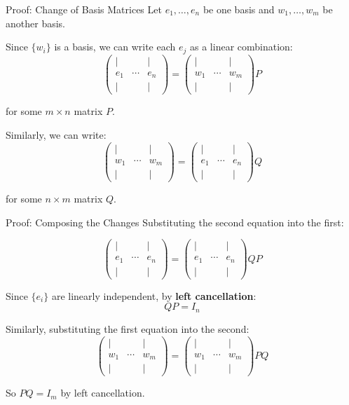 \documentclass[10pt]{beamer}
\theoremstyle{definition}
\newcommand{\x}[1]{\alert{\textbf{#1}}}
\begin{document}
\begin{frame}{Proof: Change of Basis Matrices}
Let $e_1, \ldots, e_n$ be one basis and $w_1, \ldots, w_m$ be another basis.

\vfill
Since $\{w_i\}$ is a basis, we can write each $e_j$ as a linear combination:
$$\begin{pmatrix} | & & | \\ e_1 & \cdots & e_n \\ | & & | \end{pmatrix} = \begin{pmatrix} | & & | \\ w_1 & \cdots & w_m \\ | & & | \end{pmatrix} P$$

for some $m \times n$ matrix $P$.

\vfill
Similarly, we can write:
$$\begin{pmatrix} | & & | \\ w_1 & \cdots & w_m \\ | & & | \end{pmatrix} = \begin{pmatrix} | & & | \\ e_1 & \cdots & e_n \\ | & & | \end{pmatrix} Q$$

for some $n \times m$ matrix $Q$.
\end{frame}

\begin{frame}{Proof: Composing the Changes}
Substituting the second equation into the first:

$$\begin{pmatrix} | & & | \\ e_1 & \cdots & e_n \\ | & & | \end{pmatrix} = \begin{pmatrix} | & & | \\ e_1 & \cdots & e_n \\ | & & | \end{pmatrix} QP$$

\vfill
Since $\{e_i\}$ are linearly independent, by \x{left cancellation}:
$$QP = I_n$$

\vfill
Similarly, substituting the first equation into the second:
$$\begin{pmatrix} | & & | \\ w_1 & \cdots & w_m \\ | & & | \end{pmatrix} = \begin{pmatrix} | & & | \\ w_1 & \cdots & w_m \\ | & & | \end{pmatrix} PQ$$

So $PQ = I_m$ by left cancellation.
\end{frame}
\end{document}
